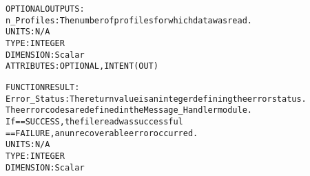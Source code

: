 \begin{alltt}
  OPTIONAL OUTPUTS:
        n_Profiles:   The number of profiles for which data was read.
                      UNITS:      N/A
                      TYPE:       INTEGER
                      DIMENSION:  Scalar
                      ATTRIBUTES: OPTIONAL, INTENT(OUT)
 
  FUNCTION RESULT:
        Error_Status: The return value is an integer defining the error status.
                      The error codes are defined in the Message_Handler module.
                      If == SUCCESS, the file read was successful
                         == FAILURE, an unrecoverable error occurred.
                      UNITS:      N/A
                      TYPE:       INTEGER
                      DIMENSION:  Scalar
 
  \end{alltt}
